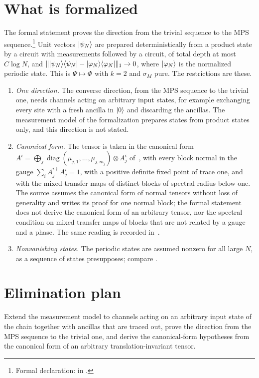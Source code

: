 \documentclass{article}
\begin{document}
\section{What is formalized}
The formal statement proves the direction from the trivial sequence to the MPS
sequence.\footnote{Formal declaration:
    in .}
Unit vectors $|\psi_N\rangle$ are prepared deterministically from a product state
by a circuit with measurements followed by a circuit, of total depth at most
$C\log N$, and
$\lVert|\psi_N\rangle\langle \psi_N|-|\varphi_N\rangle\langle \varphi_N|\rVert_1\to0$,
where $|\varphi_N\rangle$ is the normalized periodic state. This is
$\Psi\mapsto\Phi$ with $k=2$ and $\sigma_M$ pure. The restrictions are these.
\begin{enumerate}
    \item \emph{One direction.} The converse direction, from the MPS sequence
          to the trivial one, needs channels acting on arbitrary input states,
          for example exchanging every site with a fresh ancilla in $|0\rangle$ and
          discarding the ancillas. The measurement model of the formalization
          prepares states from product states only, and this direction is not
          stated.
    \item \emph{Canonical form.} The tensor is taken in the canonical form
          $A^i=\bigoplus_j\operatorname{diag}(\mu_{j,1},\dots,\mu_{j,m_j})\otimes
              A^i_j$ of~\cite{Malz2024Preparation}, with every block normal in
          the gauge $\sum_iA_j^{i\dagger}A_j^i=1$, with a positive definite
          fixed point of trace one, and with the mixed transfer maps of
          distinct blocks of spectral radius below one. The source assumes
          the canonical form of normal tensors without loss of generality and
          writes its proof for one normal block; the formal statement does not
          derive the canonical form of an arbitrary tensor, nor the spectral
          condition on mixed transfer maps of blocks that are not related by a
          gauge and a phase. The same reading is recorded
          in~\cite{gap:mswc24_block_form_mixed_overlap}.
    \item \emph{Nonvanishing states.} The periodic states are assumed nonzero
          for all large $N$, as a sequence of states presupposes; compare
          \cite{gap:mswc24_depth_upper_bound_nonzero_state}.
\end{enumerate}

\section{Elimination plan}
Extend the measurement model to channels acting on an arbitrary input state of
the chain together with ancillas that are traced out, prove the direction from
the MPS sequence to the trivial one, and derive the canonical-form hypotheses
from the canonical form of an arbitrary translation-invariant tensor.



\end{document}
